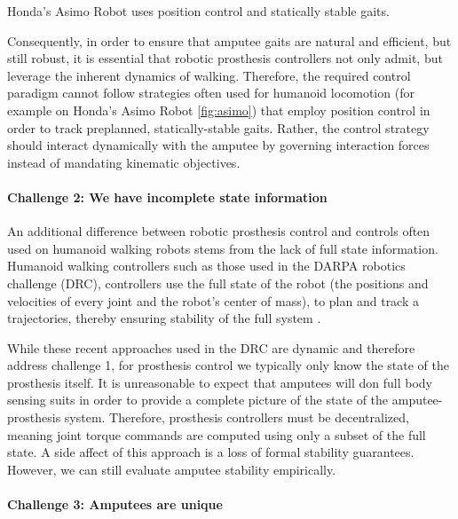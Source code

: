 \begin{marginfigure}
    \centering
    \caption{Honda's Asimo Robot uses position control and statically
    stable gaits.}
    \label{fig:asimo}
\end{marginfigure}

Consequently, in order to ensure that amputee gaits are natural and efficient,
but still robust, it is essential that robotic prosthesis controllers not only
admit, but leverage the inherent dynamics of walking.  Therefore, the required
control paradigm cannot follow strategies often used for humanoid locomotion
(for example on Honda's Asimo Robot \cref{fig:asimo}) that employ position
control in order to track preplanned, statically-stable gaits. Rather, the
control strategy should interact dynamically with the amputee by governing
interaction forces instead of mandating kinematic objectives.

\paragraph{Challenge 2: We have incomplete state information}

An additional difference between robotic prosthesis control and controls often
used on humanoid walking robots stems from the lack of full state information.
Humanoid walking controllers such as those used in the DARPA robotics challenge
(DRC), controllers use the full state of the robot (\ie the positions and
velocities of every joint and the robot's center of mass), to plan and track a
trajectories, thereby ensuring stability of the full system
\citep{feng2015optimization, kuindersma2014efficiently,
englsberger2014trajectory}.

While these recent approaches used in the DRC are dynamic and therefore address
challenge 1, for prosthesis control we typically only know the state of the
prosthesis itself. It is unreasonable to expect that amputees will don full body
sensing suits in order to provide a complete picture of the state of the
amputee-prosthesis system. Therefore, prosthesis controllers must be
decentralized, meaning joint torque commands are computed using only a subset of
the full state. A side affect of this approach is a loss of formal stability
guarantees. However, we can still evaluate amputee stability empirically.

\paragraph{Challenge 3: Amputees are unique}

